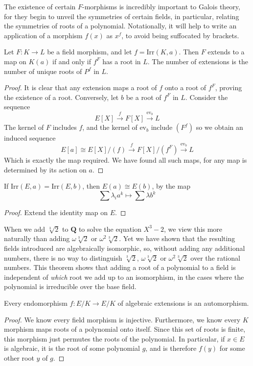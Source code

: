 The existence of certain $F$-morphisms is incredibly important to Galois theory, for they begin to unveil the symmetries of certain fields, in particular, relating the symmetries of roots of a polynomial. Notationally, it will help to write an application of a morphism $f(x)$ as $x^f$, to avoid being suffocated by brackets.

\begin{lemma}
    Let $F:K \to L$ be a field morphism, and let $f = \text{Irr}(K,a)$. Then $F$ extends to a map on $K(a)$ if and only if $f^F$ has a root in $L$. The number of extensions is the number of unique roots of $P^f$ in $L$.
\end{lemma}
\begin{proof}
    It is clear that any extension maps a root of $f$ onto a root of $f^F$, proving the existence of a root. Conversely, let $b$ be a root of $f^F$ in $L$. Consider the sequence
    \[ E[X] \xrightarrow{f} F[X] \xrightarrow{\text{ev}_b} L \]
    The kernel of $F$ includes $f$, and the kernel of $\text{ev}_b$ include $(F^f)$ so we obtain an induced sequence
    \[ E[a] \cong E[X]/(f) \xrightarrow{f} F[X]/(f^F) \xrightarrow{\text{ev}_b} L \]
    Which is exactly the map required. We have found all such maps, for any map is determined by its action on $a$.
\end{proof}

\begin{corollary}
    If $\text{Irr}(E,a) = \text{Irr}(E,b)$, then $E(a) \cong E(b)$, by the map
    \[ \sum \lambda_i a^k \mapsto \sum \lambda b^k \]
\end{corollary}
\begin{proof}
    Extend the identity map on $E$.
\end{proof}

When we add $\sqrt[3]{2}$ to $\mathbf{Q}$ to solve the equation $X^3 - 2$, we view this more naturally than adding $\omega \sqrt[3]{2}$ or $\omega^2 \sqrt[3]{2}$. Yet we have shown that the resulting fields introduced are algebraically isomorphic, so, without adding any additional numbers, there is no way to distinguish $\sqrt[3]{2}$, $\omega \sqrt[3]{2}$ or $\omega^2 \sqrt[3]{2}$ over the rational numbers. This theorem shows that adding a root of a polynomial to a field is independent of {\it which} root we add up to an isomorphism, in the cases where the polynomial is irreducible over the base field.

\begin{corollary}
    Every endomorphism $f: E/K \to E/K$ of algebraic extensions is an automorphism.
\end{corollary}
\begin{proof}
	We know every field morphism is injective. Furthermore, we know every $K$ morphism maps roots of a polynomial onto itself. Since this set of roots is finite, this morphism just permutes the roots of the polynomial. In particular, if $x \in E$ is algebraic, it is the root of some polynomial $g$, and is therefore $f(y)$ for some other root $y$ of $g$.
\end{proof}

